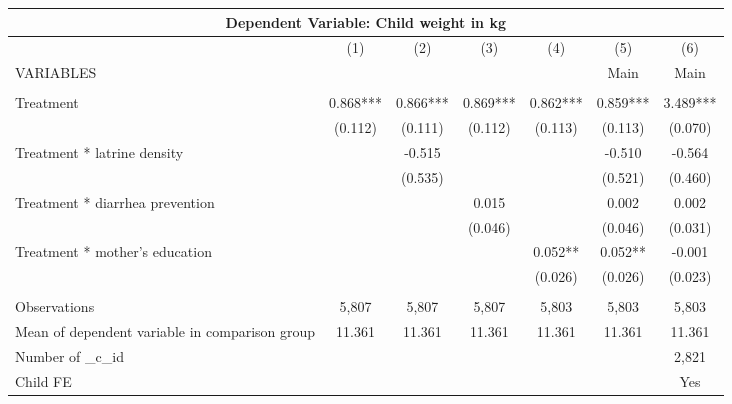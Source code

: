 \begin{tabular}{lcccccc}
\multicolumn{7}{c}{Dependent Variable: Child weight in kg} \\ \hline
 & (1) & (2) & (3) & (4) & (5) & (6) \\
VARIABLES &  &  &  &  & Main & Main \\ \hline
 &  &  &  &  &  &  \\
Treatment & 0.868*** & 0.866*** & 0.869*** & 0.862*** & 0.859*** & 3.489*** \\
 & (0.112) & (0.111) & (0.112) & (0.113) & (0.113) & (0.070) \\
Treatment * latrine density &  & -0.515 &  &  & -0.510 & -0.564 \\
 &  & (0.535) &  &  & (0.521) & (0.460) \\
Treatment * diarrhea prevention &  &  & 0.015 &  & 0.002 & 0.002 \\
 &  &  & (0.046) &  & (0.046) & (0.031) \\
Treatment * mother's education &  &  &  & 0.052** & 0.052** & -0.001 \\
 &  &  &  & (0.026) & (0.026) & (0.023) \\
 &  &  &  &  &  &  \\
Observations & 5,807 & 5,807 & 5,807 & 5,803 & 5,803 & 5,803 \\
Mean of dependent variable in comparison group & 11.361 & 11.361 & 11.361 & 11.361 & 11.361 & 11.361 \\
Number of \_c\_id &  &  &  &  &  & 2,821 \\
 Child FE &  &  &  &  &  & Yes \\ \hline
\end{tabular}
